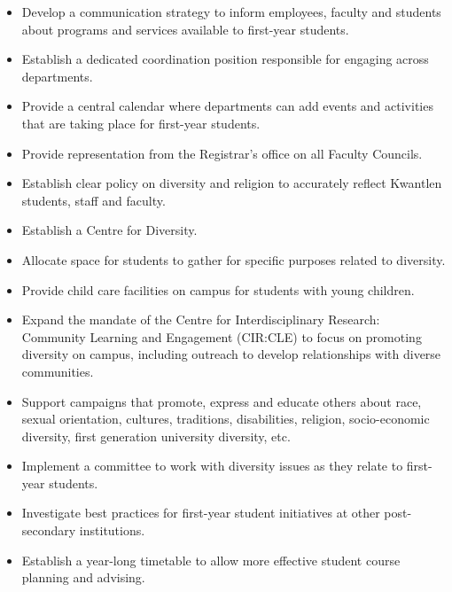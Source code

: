 \documentclass[10pt, letterpaper]{article}
\begin{document}
\begin{itemize}
\item
  Develop a communication strategy to inform employees, faculty and
  students about programs and services available to first-year students.
\item
  Establish a dedicated coordination position responsible for engaging
  across departments.
\item
  Provide a central calendar where departments can add events and
  activities that are taking place for first-year students.
\item
  Provide representation from the Registrar's office on all Faculty
  Councils.
\item
  Establish clear policy on diversity and religion to accurately reflect
  Kwantlen students, staff and faculty.
\item
  Establish a Centre for Diversity.
\item
  Allocate space for students to gather for specific purposes related to
  diversity.
\item
  Provide child care facilities on campus for students with young
  children.
\item
  Expand the mandate of the Centre for Interdisciplinary Research:
  Community Learning and Engagement (CIR:CLE) to focus on promoting
  diversity on campus, including outreach to develop relationships with
  diverse communities.
\item
  Support campaigns that promote, express and educate others about race,
  sexual orientation, cultures, traditions, disabilities, religion,
  socio-economic diversity, first generation university diversity, etc.
\item
  Implement a committee to work with diversity issues as they relate to
  first-year students.
\item
  Investigate best practices for first-year student initiatives at other
  post-secondary institutions.
\item
  Establish a year-long timetable to allow more effective student course
  planning and advising.
\end{itemize}
\end{document}
